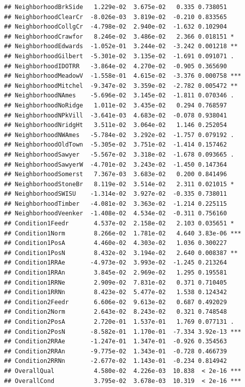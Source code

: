 \documentclass[american,]{article}
\theoremstyle{definition}
\theoremstyle{definition}
\theoremstyle{definition}
\theoremstyle{remark}
\begin{document}
\begin{verbatim}
## NeighborhoodBrkSide   1.229e-02  3.675e-02   0.335 0.738051    
## NeighborhoodClearCr  -8.026e-03  3.819e-02  -0.210 0.833565    
## NeighborhoodCollgCr  -4.798e-02  2.940e-02  -1.632 0.102904    
## NeighborhoodCrawfor   8.246e-02  3.486e-02   2.366 0.018151 *  
## NeighborhoodEdwards  -1.052e-01  3.244e-02  -3.242 0.001218 ** 
## NeighborhoodGilbert  -5.301e-02  3.135e-02  -1.691 0.091071 .  
## NeighborhoodIDOTRR   -3.864e-02  4.270e-02  -0.905 0.365690    
## NeighborhoodMeadowV  -1.558e-01  4.615e-02  -3.376 0.000758 ***
## NeighborhoodMitchel  -9.347e-02  3.359e-02  -2.782 0.005472 ** 
## NeighborhoodNAmes    -5.696e-02  3.145e-02  -1.811 0.070346 .  
## NeighborhoodNoRidge   1.011e-02  3.435e-02   0.294 0.768597    
## NeighborhoodNPkVill  -3.641e-03  4.683e-02  -0.078 0.938041    
## NeighborhoodNridgHt   3.511e-02  3.064e-02   1.146 0.252054    
## NeighborhoodNWAmes   -5.784e-02  3.292e-02  -1.757 0.079192 .  
## NeighborhoodOldTown  -5.305e-02  3.751e-02  -1.414 0.157462    
## NeighborhoodSawyer   -5.567e-02  3.318e-02  -1.678 0.093665 .  
## NeighborhoodSawyerW  -4.701e-02  3.243e-02  -1.450 0.147364    
## NeighborhoodSomerst   7.367e-03  3.683e-02   0.200 0.841496    
## NeighborhoodStoneBr   8.119e-02  3.514e-02   2.311 0.021015 *  
## NeighborhoodSWISU    -1.314e-02  3.927e-02  -0.335 0.738011    
## NeighborhoodTimber   -4.081e-02  3.363e-02  -1.214 0.225115    
## NeighborhoodVeenker  -1.408e-02  4.534e-02  -0.311 0.756160    
## Condition1Feedr       4.537e-02  2.158e-02   2.103 0.035651 *  
## Condition1Norm        8.266e-02  1.781e-02   4.640 3.83e-06 ***
## Condition1PosA        4.460e-02  4.303e-02   1.036 0.300227    
## Condition1PosN        8.432e-02  3.194e-02   2.640 0.008387 ** 
## Condition1RRAe       -4.973e-02  3.993e-02  -1.245 0.213264    
## Condition1RRAn        3.845e-02  2.969e-02   1.295 0.195581    
## Condition1RRNe        2.909e-02  7.831e-02   0.371 0.710405    
## Condition1RRNn        8.423e-02  5.477e-02   1.538 0.124342    
## Condition2Feedr       6.606e-02  9.613e-02   0.687 0.492029    
## Condition2Norm        2.643e-02  8.243e-02   0.321 0.748548    
## Condition2PosA        2.720e-01  1.537e-01   1.769 0.077131 .  
## Condition2PosN       -8.582e-01  1.170e-01  -7.334 3.92e-13 ***
## Condition2RRAe       -1.247e-01  1.347e-01  -0.926 0.354563    
## Condition2RRAn       -9.775e-02  1.343e-01  -0.728 0.466739    
## Condition2RRNn       -2.677e-02  1.143e-01  -0.234 0.814942    
## OverallQual           4.580e-02  4.226e-03  10.838  < 2e-16 ***
## OverallCond           3.795e-02  3.678e-03  10.319  < 2e-16 ***

\end{verbatim}
\end{document}
